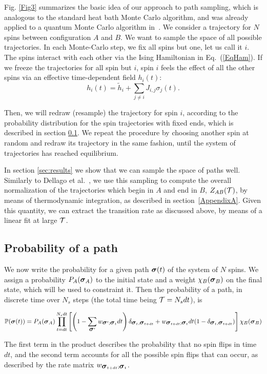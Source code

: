\documentclass[aps,twocolumn,floats,pre,amsmath,superscriptaddress]{revtex4}
\newcommand{\beq}{\begin{equation}}
\newcommand{\eeq}{\end{equation}}
\def\TT{{\cal T}}\def\NN{{\cal N}} \def\BB{{\cal B}}\def\II{{\cal I}}
\newcommand{\<}{\langle}
\renewcommand{\>}{\rangle}
\newcommand{\bs}{ \mbox{\boldmath$\sigma$}}
\begin{document}
Fig. \ref{Fig3} summarizes the basic idea of our approach to path sampling,
which is analogous to the standard heat bath Monte Carlo algorithm, and was already
applied to a quantum
Monte Carlo algorithm in~\cite{francescoprb}.
We consider a trajectory for
$N$ spins between configuration $A$ and $B$. We want to sample the
space of all possible trajectories. In each Monte-Carlo step, we fix all spins but
one, let us call it $i$. The spins interact with each other via the
Ising Hamiltonian in Eq.~(\ref{EqHam}). If we freeze the trajectories
for all spin but $i$, spin $i$ feels the effect of all the other spins
via an effective time-dependent field $h_i(t)$:
\beq
h_i(t)=\tilde{h}_i+\sum_{j \neq i} J_{i,j} \sigma_j(t).
\eeq


Then, we will redraw (resample) the trajectory for spin $i$, according
to the probability distribution for the spin trajectories with fixed
ends, which is described in section \ref{ss_weights}. We repeat the
procedure by choosing
another spin at random and redraw its trajectory in the same fashion, 
until the system of trajectories
has reached equilibrium.

In section \ref{sec:results} we show that we can sample the space of paths well.
Similarly to Dellago et al.~\cite{chandler}, we use this sampling to compute the
overall normalization of the trajectories which begin in $A$ and end in $B$,  $Z_{AB}(\TT)$,
by means of thermodynamic integration, as described in section~\ref{AppendixA}.
Given this quantity, we can extract the transition rate as discussed above, by means
of a linear fit at large $\TT$.


\subsection{Probability of a path}\label{ss_weights}

We now write the probability for a given path $\bs(t)$ of the system of $N$ spins.
We assign a probability $P_A(\bs_A)$ to the initial state and a weight
$\chi_B(\bs_B)$ on the final state, which will be used to constraint it. Then the probability of a path, in discrete time over
$N_s$ steps (the total time being ${\cal T} = N_s dt$), is
\begin{widetext}
\beq
\mathbb{P}(\bs(t)) = P_A(\bs_A) \prod_{t=dt}^{N_s dt} \left[ 
\left(1 - \sum_{\bs'} w_{\bs';\bs_t} dt \right) \delta_{\bs_t,\bs_{t+dt}}
+ w_{\bs_{t+dt};\bs_t} dt (1-\delta_{\bs_t,\bs_{t+dt}})
\right] \chi_B(\bs_B)
\eeq
\end{widetext}
The first term in the product describes the probability that no spin flips in time $dt$, and the second term accounts for all the possible spin flips that can occur, as described by the rate matrix $w_{\bs_{t+dt};\bs_t}$.
\end{document}
